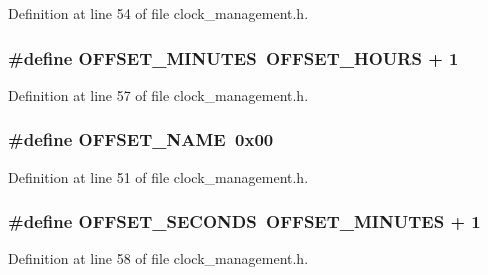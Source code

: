 Definition at line 54 of file clock\+\_\+management.\+h.

\subsubsection[{\texorpdfstring{O\+F\+F\+S\+E\+T\+\_\+\+M\+I\+N\+U\+T\+ES}{OFFSET_MINUTES}}]{\setlength{\rightskip}{0pt plus 5cm}\#define O\+F\+F\+S\+E\+T\+\_\+\+M\+I\+N\+U\+T\+ES~{\bf O\+F\+F\+S\+E\+T\+\_\+\+H\+O\+U\+RS} + 1}\hypertarget{group___clock__management__alarm__offset_gafffbfcb2669e65a487510c041aee5f06}{}\label{group___clock__management__alarm__offset_gafffbfcb2669e65a487510c041aee5f06}


Definition at line 57 of file clock\+\_\+management.\+h.

\subsubsection[{\texorpdfstring{O\+F\+F\+S\+E\+T\+\_\+\+N\+A\+ME}{OFFSET_NAME}}]{\setlength{\rightskip}{0pt plus 5cm}\#define O\+F\+F\+S\+E\+T\+\_\+\+N\+A\+ME~0x00}\hypertarget{group___clock__management__alarm__offset_ga9986a274242ed1976ceb6af6a314e424}{}\label{group___clock__management__alarm__offset_ga9986a274242ed1976ceb6af6a314e424}


Definition at line 51 of file clock\+\_\+management.\+h.

\subsubsection[{\texorpdfstring{O\+F\+F\+S\+E\+T\+\_\+\+S\+E\+C\+O\+N\+DS}{OFFSET_SECONDS}}]{\setlength{\rightskip}{0pt plus 5cm}\#define O\+F\+F\+S\+E\+T\+\_\+\+S\+E\+C\+O\+N\+DS~{\bf O\+F\+F\+S\+E\+T\+\_\+\+M\+I\+N\+U\+T\+ES} + 1}\hypertarget{group___clock__management__alarm__offset_ga9d48129268662bd4afbc63795d117ba8}{}\label{group___clock__management__alarm__offset_ga9d48129268662bd4afbc63795d117ba8}


Definition at line 58 of file clock\+\_\+management.\+h.

